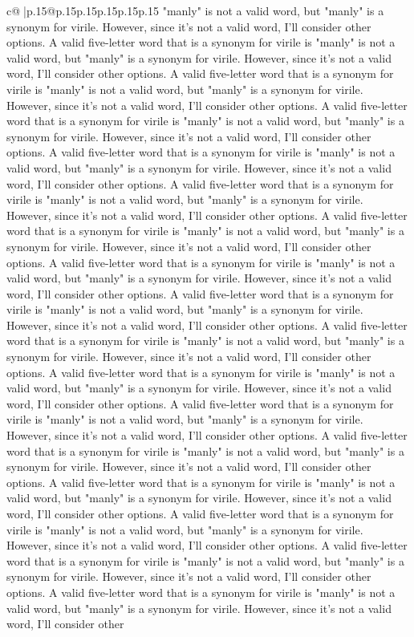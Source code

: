 \documentclass{article}
\begin{document}
{\begin{supertabular}{c@{$\;$}|p{.15\linewidth}@{}p{.15\linewidth}p{.15\linewidth}p{.15\linewidth}p{.15\linewidth}p{.15\linewidth}}
{{{"manly" is not a valid word, but "manly" is a synonym for virile. However, since it's not a valid word, I'll consider other options. A valid five{-}letter word that is a synonym for virile is "manly" is not a valid word, but "manly" is a synonym for virile. However, since it's not a valid word, I'll consider other options. A valid five{-}letter word that is a synonym for virile is "manly" is not a valid word, but "manly" is a synonym for virile. However, since it's not a valid word, I'll consider other options. A valid five{-}letter word that is a synonym for virile is "manly" is not a valid word, but "manly" is a synonym for virile. However, since it's not a valid word, I'll consider other options. A valid five{-}letter word that is a synonym for virile is "manly" is not a valid word, but "manly" is a synonym for virile. However, since it's not a valid word, I'll consider other options. A valid five{-}letter word that is a synonym for virile is "manly" is not a valid word, but "manly" is a synonym for virile. However, since it's not a valid word, I'll consider other options. A valid five{-}letter word that is a synonym for virile is "manly" is not a valid word, but "manly" is a synonym for virile. However, since it's not a valid word, I'll consider other options. A valid five{-}letter word that is a synonym for virile is "manly" is not a valid word, but "manly" is a synonym for virile. However, since it's not a valid word, I'll consider other options. A valid five{-}letter word that is a synonym for virile is "manly" is not a valid word, but "manly" is a synonym for virile. However, since it's not a valid word, I'll consider other options. A valid five{-}letter word that is a synonym for virile is "manly" is not a valid word, but "manly" is a synonym for virile. However, since it's not a valid word, I'll consider other options. A valid five{-}letter word that is a synonym for virile is "manly" is not a valid word, but "manly" is a synonym for virile. However, since it's not a valid word, I'll consider other options. A valid five{-}letter word that is a synonym for virile is "manly" is not a valid word, but "manly" is a synonym for virile. However, since it's not a valid word, I'll consider other options. A valid five{-}letter word that is a synonym for virile is "manly" is not a valid word, but "manly" is a synonym for virile. However, since it's not a valid word, I'll consider other options. A valid five{-}letter word that is a synonym for virile is "manly" is not a valid word, but "manly" is a synonym for virile. However, since it's not a valid word, I'll consider other options. A valid five{-}letter word that is a synonym for virile is "manly" is not a valid word, but "manly" is a synonym for virile. However, since it's not a valid word, I'll consider other options. A valid five{-}letter word that is a synonym for virile is "manly" is not a valid word, but "manly" is a synonym for virile. However, since it's not a valid word, I'll consider other options. A valid five{-}letter word that is a synonym for virile is "manly" is not a valid word, but "manly" is a synonym for virile. However, since it's not a valid word, I'll consider other }}}
\end{supertabular}}
\end{document}
